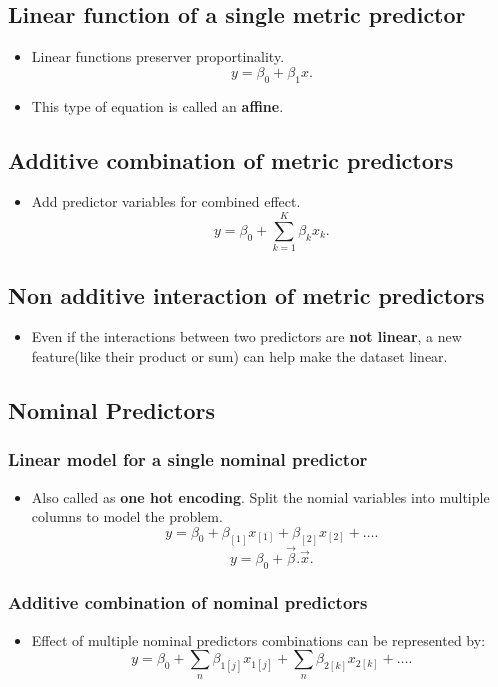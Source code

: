 \documentclass[a4paper]{article}
\begin{document}
\subsection{Linear function of a single metric predictor}
\begin{itemize}
    \item Linear functions preserver proportinality.
        \[
            y = \beta_0 + \beta_1x
        .\] 
    \item This type of equation is called an \textbf{affine}. 
\end{itemize}
\subsection{Additive combination of metric predictors}
\begin{itemize}
    \item Add predictor variables for combined effect. 
        \[
            y = \beta_0 + \sum_{k=1}^{K} \beta_kx_k
        .\] 
\end{itemize}
\subsection{Non additive interaction of metric predictors}
\begin{itemize}
    \item Even if the interactions between two predictors are \textbf{not linear}, a new feature(like their product or sum) can help make the dataset linear. 
\end{itemize}
\subsection{Nominal Predictors}
\subsubsection{Linear model for a single nominal predictor}
\begin{itemize}
    \item Also called as \textbf{one hot encoding}. Split the nomial variables into multiple columns to model the problem. 
        \[
            y = \beta_0 + \beta_{[1]}x_{[1]} + \beta_{[2]}x_{[2]} + \ldots  
        .\] 
        \[
            y = \beta_0 + \vec{\beta} . \vec{x} 
        .\] 
\end{itemize}
\subsubsection{Additive combination of nominal predictors}
\begin{itemize}
    \item Effect of multiple nominal predictors combinations can be represented by:
        \[
            y = \beta_0 + \sum_{n}\beta_{1[j]}x_{1[j]} + \sum_{n}\beta_{2[k]}x_{2[k]} + \ldots
        .\] 
\end{itemize}
\end{document}

